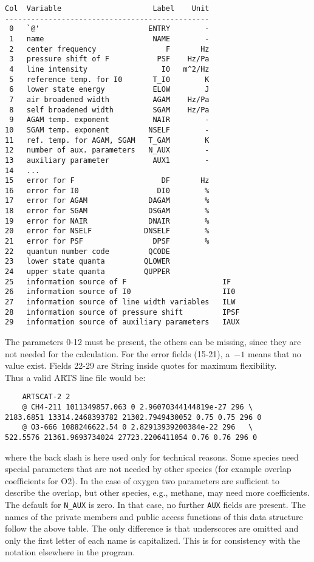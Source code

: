 {\begin{verbatim}
Col  Variable                     Label    Unit     
-----------------------------------------------      
 0   `@'                         ENTRY        -     
 1   name                         NAME        -     
 2   center frequency                F       Hz     
 3   pressure shift of F           PSF    Hz/Pa    
 4   line intensity                 I0   m^2/Hz     
 5   reference temp. for I0       T_I0        K
 6   lower state energy           ELOW        J    
 7   air broadened width          AGAM    Hz/Pa     
 8   self broadened width         SGAM    Hz/Pa
 9   AGAM temp. exponent          NAIR        -     
10   SGAM temp. exponent         NSELF        - 
11   ref. temp. for AGAM, SGAM   T_GAM        K
12   number of aux. parameters   N_AUX        -
13   auxiliary parameter          AUX1        -
14   ... 
15   error for F                    DF       Hz
16   error for I0                  DI0        %
17   error for AGAM              DAGAM        %
18   error for SGAM              DSGAM        %
19   error for NAIR              DNAIR        %
20   error for NSELF            DNSELF        %
21   error for PSF                DPSF        %
22   quantum number code         QCODE           
23   lower state quanta         QLOWER            
24   upper state quanta         QUPPER            
25   information source of F                      IF
26   information source of I0                     II0
27   information source of line width variables   ILW
28   information source of pressure shift         IPSF
29   information source of auxiliary parameters   IAUX
\end{verbatim}
The parameters 0-12 must be present, the others can be missing, since
they are not needed for the calculation. For the error fields (15-21),
a~$-1$ means that no value exist. Fields 22-29 are String inside quotes
\verb ""  for maximum flexibility.\\
Thus a valid ARTS line file would be:
\begin{verbatim}
    ARTSCAT-2 2
    @ CH4-211 1011349857.063 0 2.96070344144819e-27 296 \
2183.6851 13314.2468393782 21302.7949430052 0.75 0.75 296 0
    @ O3-666 1088246622.54 0 2.82913939200384e-22 296   \
522.5576 21361.9693734024 27723.2206411054 0.76 0.76 296 0
\end{verbatim}
where the back slash is here used only for technical reasons.
Some species need special parameters that are not needed by other
species (for example overlap coefficients for O2). In the case of
oxygen two parameters are sufficient to describe the overlap, but
other species, e.g., methane, may need more coefficients. The default
for \texttt{N\_AUX} is zero. In that case, no further \texttt{AUX}
fields are present.  The names of the private members and public
access functions of this data structure follow the above table. The
only difference is that underscores are omitted and only the first
letter of each name is capitalized. This is for consistency with the
notation elsewhere in the program.





}
